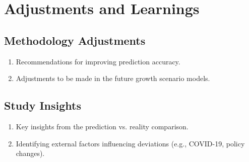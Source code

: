 \section{Adjustments and Learnings}
\label{sec:adjustments_learnings}

\subsection{Methodology Adjustments}
\begin{enumerate}
    \item Recommendations for improving prediction accuracy.
    \item Adjustments to be made in the future growth scenario models.
\end{enumerate}

\subsection{Study Insights}
\begin{enumerate}
    \item Key insights from the prediction vs. reality comparison.
    \item Identifying external factors influencing deviations (e.g., COVID-19, policy changes).
\end{enumerate}
